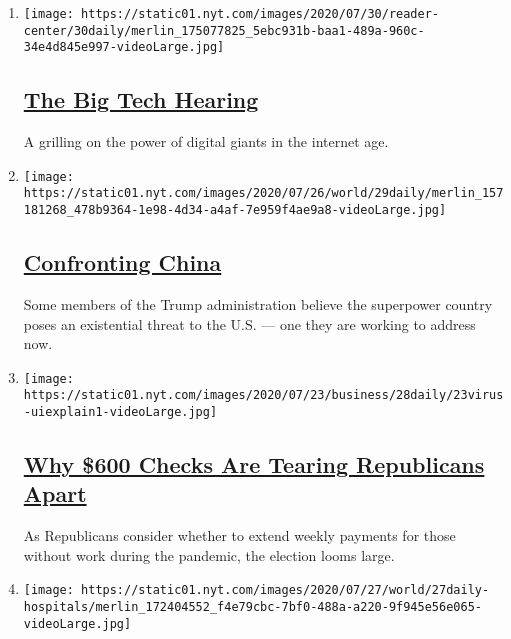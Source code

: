 \begin{enumerate}
\def\labelenumi{\arabic{enumi}.}
\item
  \texttt{[image: https://static01.nyt.com/images/2020/07/30/reader-center/30daily/merlin\_175077825\_5ebc931b-baa1-489a-960c-34e4d845e997-videoLarge.jpg]}

  \hypertarget{the-big-tech-hearing}{%
  \subsection{\texorpdfstring{\href{/2020/07/30/podcasts/the-daily/congress-facebook-amazon-google-apple.html}{The
  Big Tech Hearing}}{The Big Tech Hearing}}\label{the-big-tech-hearing}}

  A grilling on the power of digital giants in the internet age.
\item
  \texttt{[image: https://static01.nyt.com/images/2020/07/26/world/29daily/merlin\_157181268\_478b9364-1e98-4d34-a4af-7e959f4ae9a8-videoLarge.jpg]}

  \hypertarget{confronting-china}{%
  \subsection{\texorpdfstring{\href{/2020/07/29/podcasts/the-daily/china-trump-foreign-policy.html}{Confronting
  China}}{Confronting China}}\label{confronting-china}}

  Some members of the Trump administration believe the superpower
  country poses an existential threat to the U.S. --- one they are
  working to address now.
\item
  \texttt{[image: https://static01.nyt.com/images/2020/07/23/business/28daily/23virus-uiexplain1-videoLarge.jpg]}

  \hypertarget{why-600-checks-are-tearing-republicans-apart}{%
  \subsection{\texorpdfstring{\href{/2020/07/28/podcasts/the-daily/unemployment-benefits-coronavirus.html}{Why
  \$600 Checks Are Tearing Republicans
  Apart}}{Why \$600 Checks Are Tearing Republicans Apart}}\label{why-600-checks-are-tearing-republicans-apart}}

  As Republicans consider whether to extend weekly payments for those
  without work during the pandemic, the election looms large.
\item
  \texttt{[image: https://static01.nyt.com/images/2020/07/27/world/27daily-hospitals/merlin\_172404552\_f4e79cbc-7bf0-488a-a220-9f945e56e065-videoLarge.jpg]}


\end{enumerate}
